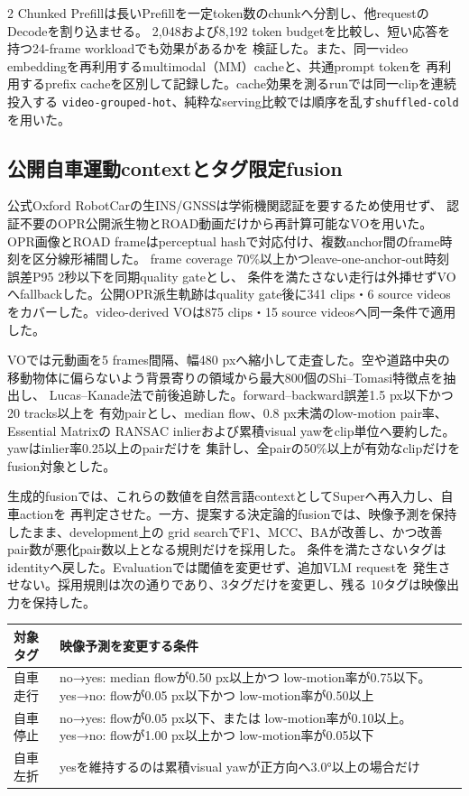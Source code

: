 \documentclass[9pt,a4paper]{extarticle}
\begin{document}
\begin{multicols}{2}
Chunked Prefillは長いPrefillを一定token数のchunkへ分割し、他requestのDecodeを割り込ませる。
2,048および8,192 token budgetを比較し、短い応答を持つ24-frame workloadでも効果があるかを
検証した。また、同一video embeddingを再利用するmultimodal（MM）cacheと、共通prompt tokenを
再利用するprefix cacheを区別して記録した。cache効果を測るrunでは同一clipを連続投入する
\texttt{video-grouped-hot}、純粋なserving比較では順序を乱す\texttt{shuffled-cold}を用いた。

\subsection{公開自車運動contextとタグ限定fusion}
公式Oxford RobotCarの生INS/GNSSは学術機関認証を要するため使用せず、
認証不要のOPR公開派生物\cite{oprproject2026}とROAD動画だけから再計算可能なVOを用いた。
OPR画像とROAD frameはperceptual hashで対応付け、複数anchor間のframe時刻を区分線形補間した。
frame coverage 70\%以上かつleave-one-anchor-out時刻誤差P95 2秒以下を同期quality gateとし、
条件を満たさない走行は外挿せずVOへfallbackした。公開OPR派生軌跡はquality gate後に341 clips・6 source videosをカバーした。video-derived VOは875 clips・15 source videosへ同一条件で適用した。

VOでは元動画を5 frames間隔、幅480 pxへ縮小して走査した。空や道路中央の
移動物体に偏らないよう背景寄りの領域から最大800個のShi--Tomasi特徴点を抽出し、
Lucas--Kanade法で前後追跡した。forward--backward誤差1.5 px以下かつ20 tracks以上を
有効pairとし、median flow、0.8 px未満のlow-motion pair率、Essential Matrixの
RANSAC inlierおよび累積visual yawをclip単位へ要約した。yawはinlier率0.25以上のpairだけを
集計し、全pairの50\%以上が有効なclipだけをfusion対象とした。

生成的fusionでは、これらの数値を自然言語contextとしてSuperへ再入力し、自車actionを
再判定させた。一方、提案する決定論的fusionでは、映像予測を保持したまま、development上の
grid searchでF1、MCC、BAが改善し、かつ改善pair数が悪化pair数以上となる規則だけを採用した。
条件を満たさないタグはidentityへ戻した。Evaluationでは閾値を変更せず、追加VLM requestを
発生させない。採用規則は次の通りであり、3タグだけを変更し、残る
10タグは映像出力を保持した。

\begin{center}
\label{tab:motion-rules}
\scriptsize
\begin{tabularx}{\columnwidth}{l>{\raggedright\arraybackslash}X}
\toprule
対象タグ & 映像予測を変更する条件\\
\midrule
自車走行 & no→yes: median flowが0.50 px以上かつ low-motion率が0.75以下。yes→no: flowが0.05 px以下かつ low-motion率が0.50以上 \\
自車停止 & no→yes: flowが0.05 px以下、または low-motion率が0.10以上。yes→no: flowが1.00 px以上かつ low-motion率が0.05以下 \\
自車左折 & yesを維持するのは累積visual yawが正方向へ3.0°以上の場合だけ \\
\bottomrule
\end{tabularx}
\end{center}


\end{multicols}
\end{document}

